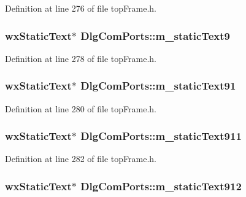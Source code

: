 Definition at line 276 of file top\-Frame.\-h.

\hypertarget{class_dlg_com_ports_ae20ae58413be1c7932f9d83f37ccfe3e}{
\subsubsection[{m\-\_\-static\-Text9}]{\setlength{\rightskip}{0pt plus 5cm}wx\-Static\-Text$\ast$ Dlg\-Com\-Ports\-::m\-\_\-static\-Text9\hspace{0.3cm}{\ttfamily [protected]}}}\label{class_dlg_com_ports_ae20ae58413be1c7932f9d83f37ccfe3e}


Definition at line 278 of file top\-Frame.\-h.

\hypertarget{class_dlg_com_ports_a4767f6424f77abf870d2c90dc7a47a9b}{
\subsubsection[{m\-\_\-static\-Text91}]{\setlength{\rightskip}{0pt plus 5cm}wx\-Static\-Text$\ast$ Dlg\-Com\-Ports\-::m\-\_\-static\-Text91\hspace{0.3cm}{\ttfamily [protected]}}}\label{class_dlg_com_ports_a4767f6424f77abf870d2c90dc7a47a9b}


Definition at line 280 of file top\-Frame.\-h.

\hypertarget{class_dlg_com_ports_a7a45e6c9f89fa6595fe30611d3240760}{
\subsubsection[{m\-\_\-static\-Text911}]{\setlength{\rightskip}{0pt plus 5cm}wx\-Static\-Text$\ast$ Dlg\-Com\-Ports\-::m\-\_\-static\-Text911\hspace{0.3cm}{\ttfamily [protected]}}}\label{class_dlg_com_ports_a7a45e6c9f89fa6595fe30611d3240760}


Definition at line 282 of file top\-Frame.\-h.

\hypertarget{class_dlg_com_ports_a49c213a919a1aff50754fad11b67a44d}{
\subsubsection[{m\-\_\-static\-Text912}]{\setlength{\rightskip}{0pt plus 5cm}wx\-Static\-Text$\ast$ Dlg\-Com\-Ports\-::m\-\_\-static\-Text912\hspace{0.3cm}{\ttfamily [protected]}}}\label{class_dlg_com_ports_a49c213a919a1aff50754fad11b67a44d}


